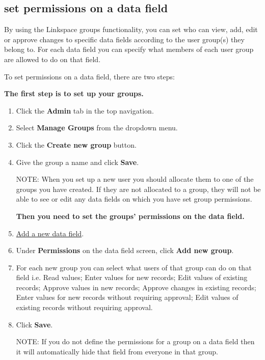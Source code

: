 \documentclass{ctrlo-int-toc}
\begin{document}
\begin{admin}
\subsection[set permissions on a data field]{set permissions on a data field}
\label{subsec:setfieldperms}
By using the Linkspace groups functionality, you can set who can view, add, edit or approve changes to specific data fields according to the user group(s) they belong to. For each data field you can specify what members of each user group are allowed to do on that field.

To set permissions on a data field, there are two steps:

\textbf{The first step is to set up your groups.}

\begin{enumerate}
    \item Click the \textbf{Admin} tab in the top navigation.
    \item Select \textbf{Manage Groups} from the dropdown menu.
    \item Click the \textbf{Create new group} button.
    \item Give the group a name and click \textbf{Save}.

\begin{notebox}
NOTE: When you set up a new user you should allocate them to one of the groups you have created. If they are not allocated to a group, they will not be able to see or edit any data fields on which you have set group permissions.
\end{notebox}

\textbf{Then you need to set the groups’ permissions on the data field.}

    \item \hyperref[subsec:addfield]{Add a new data field}.
    \item Under \textbf{Permissions} on the data field screen, click \textbf{Add new group}.
    \item For each new group you can select what users of that group can do on that field i.e. Read values; Enter values for new records; Edit values of existing records; Approve values in new records; Approve changes in existing records; Enter values for new records without requiring approval; Edit values of existing records without requiring approval.
    \item Click \textbf{Save}.

\begin{notebox}
NOTE: If you do not define the permissions for a group on a data field then it will automatically hide that field from everyone in that group. 
\end{notebox}


\end{enumerate}
\end{admin}
\end{document}
